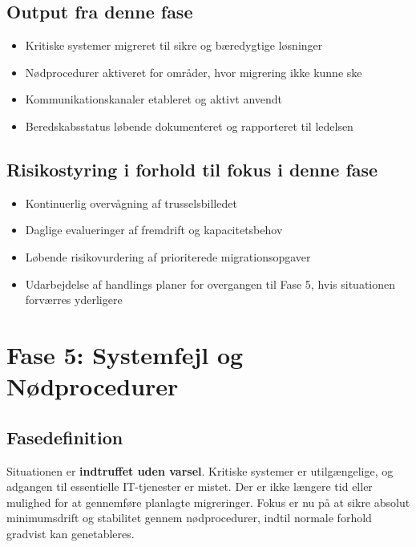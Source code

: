 \documentclass[a4paper,11pt]{book}
\begin{document}
\section{Output fra denne fase}\label{output-fra-denne-fase}

\begin{itemize}
\tightlist
\item
  Kritiske systemer migreret til sikre og bæredygtige løsninger
\item
  Nødprocedurer aktiveret for områder, hvor migrering ikke kunne ske
\item
  Kommunikationskanaler etableret og aktivt anvendt
\item
  Beredskabsstatus løbende dokumenteret og rapporteret til ledelsen
\end{itemize}

\section{Risikostyring i forhold til fokus i denne
fase}\label{risikostyring-i-forhold-til-fokus-i-denne-fase}

\begin{itemize}
\tightlist
\item
  Kontinuerlig overvågning af trusselsbilledet
\item
  Daglige evalueringer af fremdrift og kapacitetsbehov
\item
  Løbende risikovurdering af prioriterede migrationsopgaver
\item
  Udarbejdelse af handlings planer for overgangen til Fase 5, hvis
  situationen forværres yderligere
\end{itemize}

\newpage

\chapter{Fase 5: Systemfejl og
Nødprocedurer}\label{fase-5-systemfejl-og-nuxf8dprocedurer}

\section{Fasedefinition}\label{fasedefinition}

Situationen er \textbf{indtruffet uden varsel}. Kritiske systemer er
utilgængelige, og adgangen til essentielle IT-tjenester er mistet. Der
er ikke længere tid eller mulighed for at gennemføre planlagte
migreringer. Fokus er nu på at sikre absolut minimumsdrift og stabilitet
gennem nødprocedurer, indtil normale forhold gradvist kan genetableres.
\end{document}
